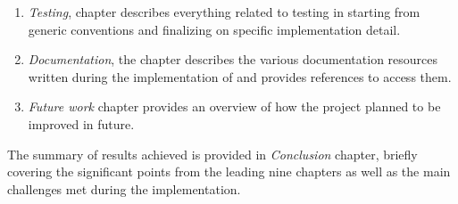 \begin{enumerate}
    \item \textit{Testing}, chapter describes everything related to testing in \lpas{} starting from generic conventions and finalizing on specific implementation detail.
    
    \item \textit{Documentation}, the chapter describes the various documentation resources written during the implementation of \lpa{} and provides references to access them.
     
     \item \textit{Future work} chapter provides an overview of how the project planned to be improved in future. 
\end{enumerate}

The summary of results achieved is provided in \textit{Conclusion} chapter, briefly covering the significant points from the leading nine chapters as well as the main challenges met during the implementation.